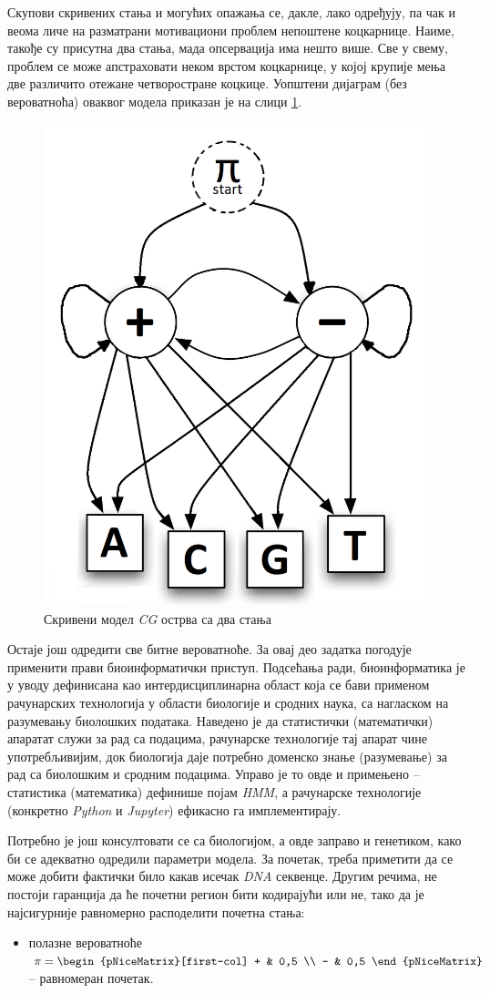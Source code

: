 \documentclass[12pt,oneside]{memoir}
\begin{document}
\begin{CJK}{UTF8}{ipxm}
Скупови скривених стања и могућих опажања се, дакле, лако одређују, па чак и веома личе на разматрани мотивациони проблем непоштене коцкарнице. Наиме, такође су присутна два стања, мада опсервација има нешто више. Све у свему, проблем се може апстраховати неком врстом коцкарнице, у којој крупије мења две различито отежане четворостране коцкице. Уопштени дијаграм (без вероватноћа) оваквог модела приказан је на слици \ref{fig:cg_graf}.

\begin{figure}[H]
  \centering
  \includegraphics[width=.5\textwidth]{cg_graf.png}
  \caption{Скривени модел \textit{CG} острва са два стања}
  \label{fig:cg_graf}
\end{figure}

Остаје још одредити све битне вероватноће. За овај део задатка погодује применити прави биоинформатички приступ. Подсећања ради, биоинформатика је у уводу дефинисана као интердисциплинарна област која се бави применом рачунарских технологија у области биологије и сродних наука, са нагласком на разумевању биолошких података. Наведено је да статистички (математички) апаратат служи за рад са подацима, рачунарске технологије тај апарат чине употребљивијим, док биологија даје потребно доменско знање (разумевање) за рад са биолошким и сродним подацима. Управо је то овде и примењено -- статистика (математика) дефинише појам \textit{HMM}, а рачунарске технологије (конкретно \textit{Python} и \textit{Jupyter}) ефикасно га имплементирају.

Потребно је још консултовати се са биологијом, а овде заправо и генетиком, како би се адекватно одредили параметри модела. За почетак, треба приметити да се може добити фактички било какав исечак \textit{DNA} секвенце. Другим речима, не постоји гаранција да ће почетни регион бити кодирајући или не, тако да је најсигурније равномерно расподелити почетна стања:
\begin{itemize}
  \item полазне вероватноће $\pi = \begin{pNiceMatrix}[first-col] + & 0,5 \\ - & 0,5 \end{pNiceMatrix}$ -- равномеран почетак.
\end{itemize}


\end{CJK}
\end{document}
